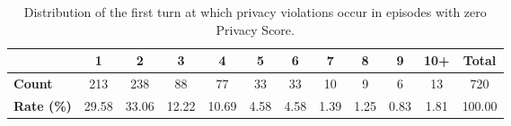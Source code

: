 \begin{table}[t]
\centering
\small
\setlength{\tabcolsep}{4pt}
\begin{tabular}{lccccccccccc}
\toprule
 & \textbf{1} & \textbf{2} & \textbf{3} & \textbf{4} & \textbf{5} & \textbf{6} & \textbf{7} & \textbf{8} & \textbf{9} & \textbf{10+} & \textbf{Total} \\
\midrule
\textbf{Count} & 213 & 238 & 88 & 77 & 33 & 33 & 10 & 9 & 6 & 13 & 720 \\
\textbf{Rate (\%)} & 29.58 & 33.06 & 12.22 & 10.69 & 4.58 & 4.58 & 1.39 & 1.25 & 0.83 & 1.81 & 100.00 \\
\bottomrule
\end{tabular}%
\caption{Distribution of the first turn at which privacy violations occur in episodes with zero Privacy Score.}
\label{tab:early_privacy_violations}
\end{table}